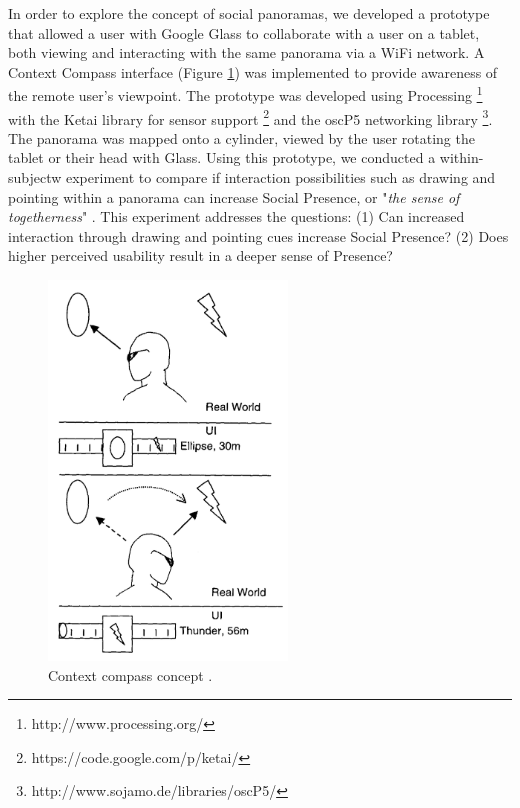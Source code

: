 In order to explore the concept of social panoramas, we developed a prototype that allowed a user with Google Glass to collaborate with a user on a tablet, both viewing and interacting with the same panorama via a WiFi network. A Context Compass interface \cite{Suomela2000} (Figure \ref{fig:ismar14:context-compass}) was implemented to provide awareness of the remote user's viewpoint. The prototype was developed using Processing \footnote{http://www.processing.org/} with the Ketai library for sensor support \footnote{https://code.google.com/p/ketai/} and the oscP5 networking library \footnote{http://www.sojamo.de/libraries/oscP5/}. The panorama was mapped onto a cylinder, viewed by the user rotating the tablet or their head with Glass. Using this prototype, we conducted a within-subjectw experiment to compare if interaction possibilities such as drawing and pointing within a panorama can increase Social Presence, or "\textit{the sense of togetherness}" \cite{Basdogan2001}. This experiment addresses the questions: (1) Can increased interaction through drawing and pointing cues increase Social Presence? (2) Does higher perceived usability result in a deeper sense of Presence? 

\begin{figure}[ht]
	\centering
	\includegraphics[width=2.5in]{images/ismar14/context-compass.PNG}
	\caption{Context compass concept \cite{Suomela2000}.}
	\label{fig:ismar14:context-compass}
\end{figure}


